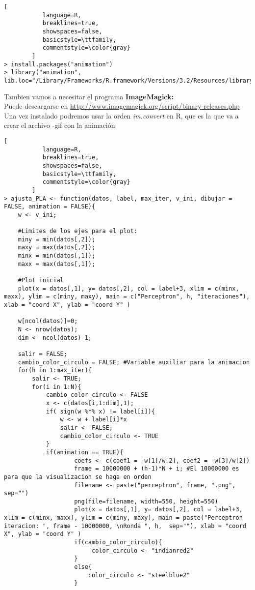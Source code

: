 \documentclass[11pt,fleqn]{book} %
\begin{document}
\begin{lstlisting}[
           language=R,
           breaklines=true,
           showspaces=false,
           basicstyle=\ttfamily,
           commentstyle=\color{gray}
        ]
> install.packages("animation")
> library("animation", lib.loc="/Library/Frameworks/R.framework/Versions/3.2/Resources/library") 
\end{lstlisting}
Tambien vamos a necesitar el programa \textbf{ImageMagick:}\\
Puede descargarse en \url{http://www.imagemagick.org/script/binary-releases.php}\\
Una vez instalado podremos usar la orden \textit{im.convert} en R, que es la que va a crear el archivo -gif con la animación 

\begin{lstlisting}[
           language=R,
           breaklines=true,
           showspaces=false,
           basicstyle=\ttfamily,
           commentstyle=\color{gray}
        ]
> ajusta_PLA <- function(datos, label, max_iter, v_ini, dibujar = FALSE, animation = FALSE){
    w <- v_ini;
    
    #Limites de los ejes para el plot:
    miny = min(datos[,2]);
    maxy = max(datos[,2]);
    minx = min(datos[,1]);
    maxx = max(datos[,1]);
    
    #Plot inicial
    plot(x = datos[,1], y= datos[,2], col = label+3, xlim = c(minx, maxx), ylim = c(miny, maxy), main = c("Perceptron", h, "iteraciones"), xlab = "coord X", ylab = "coord Y" )
    
    w[ncol(datos)]=0;
    N <- nrow(datos);
    dim <- ncol(datos)-1;
    
    salir = FALSE;
    cambio_color_circulo = FALSE; #Variable auxiliar para la animacion
    for(h in 1:max_iter){
        salir <- TRUE;
        for(i in 1:N){
            cambio_color_circulo <- FALSE
            x <- c(datos[i,1:dim],1);
            if( sign(w %*% x) != label[i]){
                w <- w + label[i]*x
                salir <- FALSE;
                cambio_color_circulo <- TRUE
            }
            if(animation == TRUE){
                    coefs <- c(coef1 = -w[1]/w[2], coef2 = -w[3]/w[2])
                    frame = 10000000 + (h-1)*N + i; #El 10000000 es para que la visualizacion se haga en orden
                    filename <- paste("perceptron", frame, ".png", sep="")
                    png(file=filename, width=550, height=550)
                    plot(x = datos[,1], y= datos[,2], col = label+3, xlim = c(minx, maxx), ylim = c(miny, maxy), main = paste("Perceptron iteracion: ", frame - 10000000,"\nRonda ", h,  sep=""), xlab = "coord X", ylab = "coord Y" )
                    if(cambio_color_circulo){
                         color_circulo <- "indianred2"
                    }
                    else{
                        color_circulo <- "steelblue2"
                    }
                   

\end{lstlisting}
\end{document}
